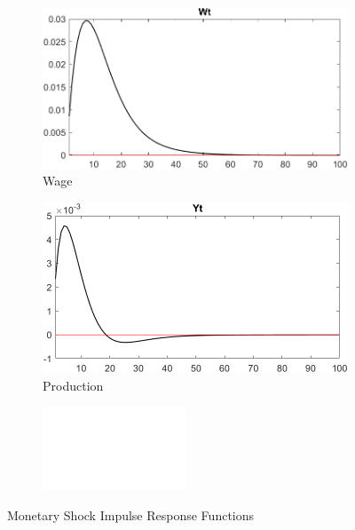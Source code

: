 \documentclass[
	12pt, 
	]{article}
\numberwithin{equation}{section}
\theoremstyle{definition}
\theoremstyle{plain}
\theoremstyle{plain}
\theoremstyle{plain}
\begin{document}
\begin{figure}[h!]
	\vspace*{0.5cm}
	
	\begin{subfigure}[b]{0.3\textwidth}
		\centering
		\includegraphics[width=\textwidth]{shock_ZMt/shock_ZMt_Wt}
		\caption{Wage}
		\label{fig:ZMt-wage}
	\end{subfigure}
	\hfill
	\begin{subfigure}[b]{0.3\textwidth}
		\centering
		\includegraphics[width=\textwidth]{shock_ZMt/shock_ZMt_Yt}
		\caption{Production}
		\label{fig:ZMt-production}
	\end{subfigure}
	\hfill
	\begin{subfigure}[b]{0.3\textwidth}
		\centering
		\includegraphics[width=\textwidth]{shock_ZMt/blank}
	\end{subfigure}
	\hfill
	\caption{Monetary Shock Impulse Response Functions}
	\label{fig:ZMt-irf}
\end{figure}
\end{document}
